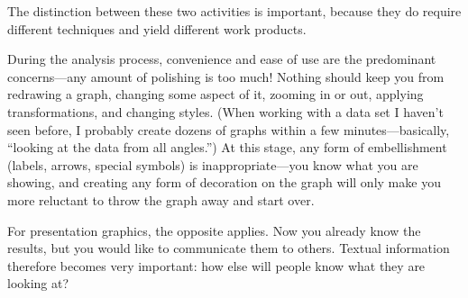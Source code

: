 The distinction between these two activities is important, because
they do require different techniques and yield different work products.

During the analysis process, convenience and ease of use are the
predominant concerns---any amount of polishing is too much! Nothing
should keep you from redrawing a graph, changing some aspect of it,
zooming in or out, applying transformations, and changing styles.
(When working with a data set I haven't seen before, I probably create
dozens of graphs within a few minutes---basically, ``looking at the
data from all angles.'')  At this stage, any form of embellishment
(labels, arrows, special symbols) is inappropriate---you know what you
are showing, and creating any form of decoration on the graph will
only make you more reluctant to throw the graph away and start over.

For presentation graphics, the opposite applies. Now you already
know the results, but you would like to communicate them to others.
Textual information therefore becomes very important: how else will
people know what they are looking at?

